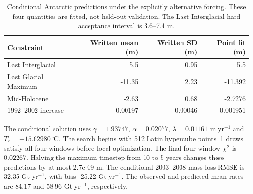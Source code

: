\begin{table}[htbp]
\centering\small
\begin{tabular}{lrrr}
\toprule
Constraint & Written mean (m) & Written SD (m) & Point fit (m) \\
\midrule
Last Interglacial & 5.5 & 0.95 & 5.5 \\
Last Glacial Maximum & -11.35 & 2.23 & -11.392 \\
Mid-Holocene & -2.63 & 0.68 & -2.7276 \\
1992--2002 increase & 0.00197 & 0.00046 & 0.001951 \\
\bottomrule\end{tabular}
\caption{Conditional Antarctic predictions under the explicitly alternative forcing. These four quantities are fitted, not held-out validation. The Last Interglacial hard acceptance interval is 3.6--7.4 m.}
\end{table}
The conditional solution uses $\gamma=1.93747$, $\alpha=0.02077$, $\lambda=0.01161$ m yr$^{-1}$ and $T_c=-15.62980\,{}^\circ$C. The search begins with 512 Latin hypercube points; 1 draws satisfy all four windows before local optimization. The final four-window $\chi^2$ is 0.02267. Halving the maximum timestep from 10 to 5 years changes these predictions by at most 2.7e-09 m. The conditional 2003--2008 mass-loss RMSE is 32.35 Gt yr$^{-1}$, with bias -25.22 Gt yr$^{-1}$. The observed and predicted mean rates are 84.17 and 58.96 Gt yr$^{-1}$, respectively.
